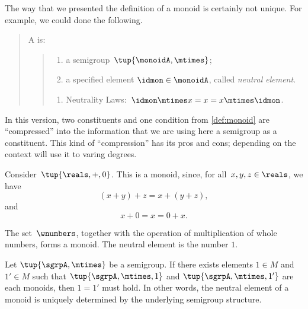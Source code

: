 \begin{remark}
  The way that we presented the definition of a monoid is certainly not unique. For example, we could done the following.

  \begin{quote}
    A \emph{} is:
    \begin{quote}
      \constit
      \begin{enumerate}
        \item a semigroup~$\tup{\monoidA, \mtimes}$;
        \item a specified element $\idmon\in \monoidA$, called \emph{neutral element}.
      \end{enumerate}
      \condit
      \begin{enumerate}
        \item Neutrality Laws:~$\idmon\mtimes x=x=x\mtimes \idmon$.
      \end{enumerate}
    \end{quote}
  \end{quote}
  In this version, two constituents and one condition from \cref{def:monoid} are ``compressed'' into the information that we are using here a semigroup as a constituent. This kind of ``compression'' has its pros and cons; depending on the context will use it to varing degrees.
\end{remark}




\begin{example}
  Consider~$\tup{\reals,+,0}$. This is a monoid, since, for all~$x,y, z \in \reals$, we have
  \begin{equation*}
  (x+y)
    +z=x+(y+z),
  \end{equation*}
  and
  \begin{equation*}
    x+0=x=0+x.
  \end{equation*}
\end{example}

\begin{example}
The set~$\wnumbers$, together with the operation of multiplication of whole numbers, forms a monoid. The neutral element is the number $1$. 
\end{example}

\begin{lemma}\label{neut-el-unique}
Let $\tup{\sgrpA, \mtimes}$ be a semigroup. If there exists elements $1 \in M$ and $1' \in M$ such that $\tup{\sgrpA, \mtimes, 1}$ and $\tup{\sgrpA, \mtimes, 1'}$ are each monoids, then $1 = 1'$ must hold. In other words, the neutral element of a monoid is uniquely determined by the underlying semigroup structure. 
\end{lemma}

